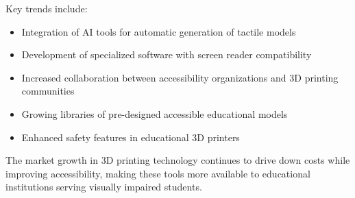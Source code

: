 Key trends include:
\begin{itemize}
    \item Integration of AI tools for automatic generation of tactile models
    \item Development of specialized software with screen reader compatibility
    \item Increased collaboration between accessibility organizations and 3D printing communities
    \item Growing libraries of pre-designed accessible educational models
    \item Enhanced safety features in educational 3D printers
\end{itemize}

The market growth in 3D printing technology continues to drive down costs while improving accessibility, making these tools more available to educational institutions serving visually impaired students.
